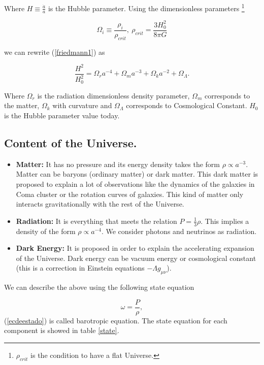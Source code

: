 \documentclass[onecolumn,           %
               showpacs,            %
               preprintnumbers,     %
               aps,                 %
               letterpaper,             %
               superscriptaddress,      %
               nofootinbib,         %
               tightenlines,        %
               floats,floatfix      %
               ,usenatbib,
               ]{revtex4-1}
\begin{document}
Where $H \equiv \frac{\dot{a}}{a}$ is the Hubble parameter. Using the dimensionless parameters \footnote{$\rho_{crit}$ is the condition to have a flat Universe.}

\begin{equation}
\Omega_{i} \equiv \frac{\rho_i}{\rho_{crit}}, \ \rho_{crit} = \frac{3H_0^2}{8 \pi G}
\end{equation} 

we can rewrite (\ref{friedmann1}) as

\begin{equation}
\frac{H^2}{H_0^2} = \Omega_r a^{-4} + \Omega_m a^{-3} + \Omega_k a^{-2} + \Omega_{\Lambda} .
\end{equation}

Where $\Omega_r$ is the radiation dimensionless density parameter, $\Omega_m$ corresponds to the matter, $\Omega_k$ with curvature and $\Omega_{\Lambda}$ corresponds to Cosmological Constant. $H_0$ is the Hubble parameter value today.

\subsection{Content of the Universe.}

\begin{itemize}
	\item \textbf{Matter:} It has no pressure and its energy density takes the form $\rho \propto a^{-3}.$ Matter can be baryons (ordinary matter) or dark matter. This dark matter is proposed to explain a lot of observations like the dynamics of the galaxies in Coma cluster or the rotation curves of galaxies. This kind of matter only interacts gravitationally with the rest of the Universe.
	\item \textbf{Radiation:} It is everything that meets the relation $P = \frac{1}{3} \rho$. This implies a density of the form $\rho \propto a^{-4}$. We consider photons and neutrinos as radiation.
	\item \textbf{Dark Energy:} It is proposed in order to explain the accelerating expansion of the Universe. Dark energy can be vacuum energy or cosmological constant (this is a correction in Einstein equations $-\Lambda g_{\mu \nu}$).
\end{itemize}

We can describe the above using the following state equation

\begin{equation}
\label{ecdeestado}
\omega = \frac{P}{\rho},
\end{equation}
(\ref{ecdeestado}) is called barotropic equation. The state equation for each component is showed in table \ref{state}.
\end{document}
